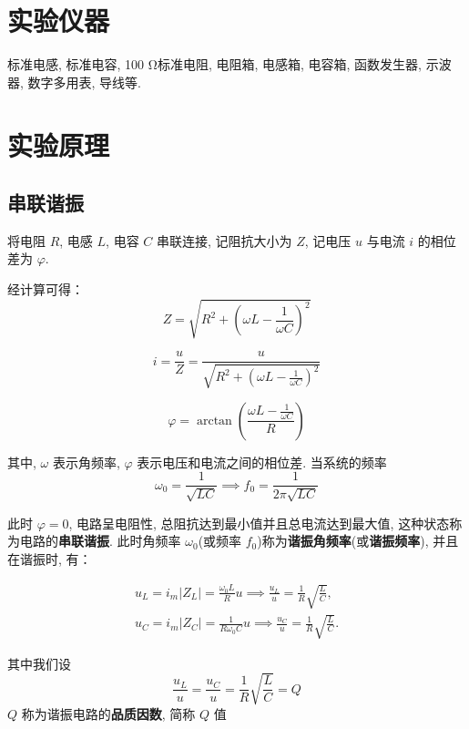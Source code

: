 \documentclass[zihao=5, UTF8]{article}
\theoremstyle{MyLineTheoremStyle} %
\theoremstyle{MyBlockTheoremStyle} %
\theoremstyle{MySubsubsectionStyle} %
\begin{document}
\section{实验仪器}
标准电感, 标准电容, 100 Ω标准电阻, 电阻箱, 电感箱, 电容箱, 函数发生器, 示波器, 数字多用表, 导线等. 

\section{实验原理}
\subsection{串联谐振}
将电阻 $ R $, 电感 $ L $, 电容 $ C $ 串联连接, 记阻抗大小为 $ Z $, 记电压 $ u $ 与电流 $ i $ 的相位差为 $ \varphi $. 

经计算可得：
\begin{equation}
Z = \sqrt{R^2 + \left( \omega L - \frac{1}{\omega C} \right)^2}
\end{equation}

\begin{equation}
i = \frac{u}{Z} = \frac{u}{\sqrt{R^2 + \left( \omega L - \frac{1}{\omega C} \right)^2}}
\end{equation}

\begin{equation}
\varphi = \arctan\left(\frac{\omega L - \frac{1}{\omega C}}{R}\right)
\end{equation}

其中, $ \omega $ 表示角频率, $ \varphi $ 表示电压和电流之间的相位差. 当系统的频率
\begin{equation}
\omega_0 = \frac{1}{\sqrt{LC}} \implies f_0 = \frac{1}{2\pi\sqrt{LC}}
\end{equation}

此时 $\varphi = 0$, 电路呈电阻性, 总阻抗达到最小值并且总电流达到最大值, 这种状态称为电路的\textbf{串联谐振}. 此时角频率 $\omega_0$(或频率 $f_0$)称为\textbf{谐振角频率}(或\textbf{谐振频率}), 并且在谐振时, 有：

\begin{gather}
u_L = i_m |Z_L| = \frac{\omega_0 L}{R} u \implies  \frac{u_L}{u} = \frac{1}{R} \sqrt{\frac{L}{C}}, \\
u_C = i_m |Z_C| = \frac{1}{R \omega_0 C} u \implies \frac{u_C}{u} = \frac{1}{R} \sqrt{\frac{L}{C}}.
\end{gather}

其中我们设
\begin{equation}
\frac{u_L}{u} = \frac{u_C}{u} = \frac{1}{R} \sqrt{\frac{L}{C}} = Q
\end{equation}
$Q$ 称为谐振电路的\textbf{品质因数}, 简称 $Q$ 值
\end{document}
